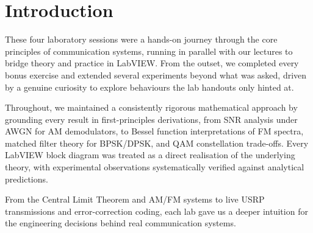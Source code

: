 \chapter{Introduction}

These four laboratory sessions were a hands-on journey through the core principles of communication systems, running in parallel with our lectures to bridge theory and practice in LabVIEW. From the outset, we completed every bonus exercise and extended several experiments beyond what was asked, driven by a genuine curiosity to explore behaviours the lab handouts only hinted at.

Throughout, we maintained a consistently rigorous mathematical approach by grounding every result in first-principles derivations, from SNR analysis under AWGN for AM demodulators, to Bessel function interpretations of FM spectra, matched filter theory for BPSK/DPSK, and QAM constellation trade-offs. Every LabVIEW block diagram was treated as a direct realisation of the underlying theory, with experimental observations systematically verified against analytical predictions.

From the Central Limit Theorem and AM/FM systems to live USRP transmissions and error-correction coding, each lab gave us a deeper intuition for the engineering decisions behind real communication systems.


